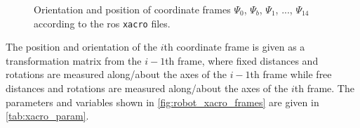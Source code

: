 \begin{figure}[htbp]
	\hspace{-10mm}
	\vspace{1mm}
	\caption{Orientation and position of coordinate frames $\Psi_0$, $\Psi_b$, $\Psi_1$, ..., $\Psi_{14}$ according to the \gls{ros} \texttt{xacro} files.}
	\label{fig:robot_xacro_frames}
\end{figure}

The position and orientation of the $i$th coordinate frame is given as a transformation matrix from the $i-1$th frame, where fixed distances and rotations are measured along/about the axes of the $i-1$th frame while free distances and rotations are measured along/about the axes of the $i$th frame. The parameters and variables shown in \autoref{fig:robot_xacro_frames} are given in \autoref{tab:xacro_param}.

